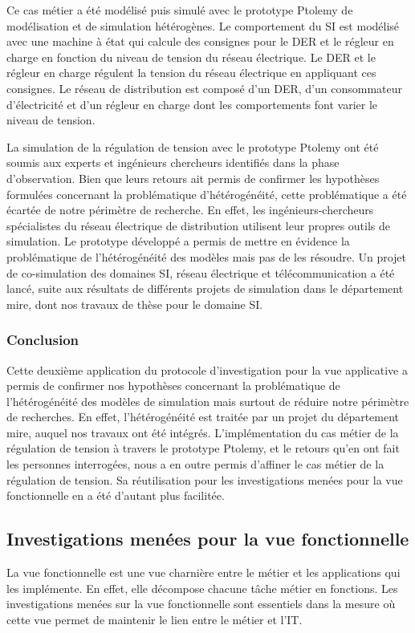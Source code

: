 		Ce cas métier a été modélisé puis simulé avec le prototype Ptolemy de modélisation et de simulation hétérogènes. Le comportement du SI est modélisé avec une machine à état qui calcule des consignes pour le DER et le régleur en charge en fonction du niveau de tension du réseau électrique. Le DER et le régleur en charge  régulent la tension du réseau électrique en appliquant ces consignes. Le réseau de distribution est composé d'un DER, d'un consommateur d'électricité et d'un régleur en charge dont les comportements font varier le niveau de tension.
		
		La simulation de la régulation de tension avec le prototype Ptolemy ont été soumis aux experts et ingénieurs chercheurs identifiés dans la phase d'observation. Bien que leurs retours ait permis de confirmer les hypothèses formulées concernant la problématique d'hétérogénéité, cette problématique a été écartée de notre périmètre de recherche. En effet, les ingénieurs-chercheurs spécialistes du réseau électrique de distribution utilisent leur propres outils de simulation. Le prototype développé a permis de mettre en évidence la problématique de l'hétérogénéité des modèles mais pas de les résoudre. Un projet de co-simulation des domaines SI, réseau électrique et télécommunication a été lancé, suite aux résultats de différents projets de simulation dans le département \gls{mire}, dont nos travaux de thèse pour le domaine SI.
		
		  
				\subsubsection{Conclusion}
		Cette deuxième application du protocole d'investigation pour la vue applicative a permis de confirmer nos hypothèses concernant la problématique de l'hétérogénéité des modèles de simulation mais surtout de réduire notre périmètre de recherches. En effet, l'hétérogénéité est traitée par un projet du département \gls{mire}, auquel nos travaux ont été intégrés. L'implémentation du cas métier de la régulation de tension à travers le prototype Ptolemy, et le retours qu'en ont fait les personnes interrogées, nous a en outre permis d'affiner le cas métier de la régulation de tension. Sa réutilisation pour les investigations menées pour la vue fonctionnelle en a été d'autant plus facilitée.   
	
		\subsection{Investigations menées pour la vue fonctionnelle} 
		La vue fonctionnelle est une vue charnière entre le métier et les applications qui les implémente. En effet, elle décompose chacune tâche métier en fonctions. Les investigations menées sur la vue fonctionnelle sont essentiels dans la mesure où cette vue permet de maintenir le lien entre le métier et l'IT. 
